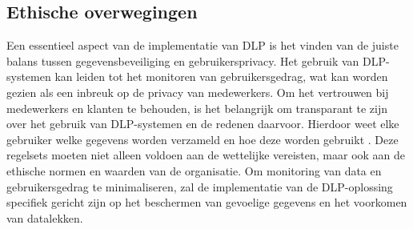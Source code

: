 \subsection{Ethische overwegingen}%

Een essentieel aspect van de implementatie van DLP is het vinden van de juiste balans tussen gegevensbeveiliging en gebruikersprivacy. 
Het gebruik van DLP-systemen kan leiden tot het monitoren van gebruikersgedrag, wat kan worden gezien als een inbreuk op de privacy van medewerkers. 
Om het vertrouwen bij medewerkers en klanten te behouden, is het belangrijk om transparant te zijn over het gebruik van DLP-systemen en de redenen daarvoor. 
Hierdoor weet elke gebruiker welke gegevens worden verzameld en hoe deze worden gebruikt \autocite{Zaini2024}. 
Deze regelsets moeten niet alleen voldoen aan de wettelijke vereisten, maar ook aan de ethische normen en waarden van de organisatie. 
Om monitoring van data en gebruikersgedrag te minimaliseren, 
zal de implementatie van de DLP-oplossing specifiek gericht zijn op het beschermen van gevoelige gegevens en het voorkomen van datalekken. 






